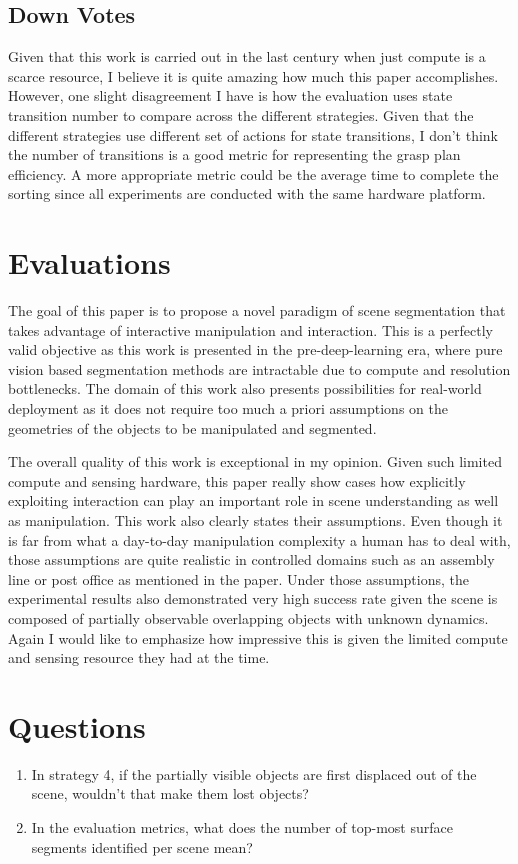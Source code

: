 \documentclass[10pt, twocolumn]{article}
\begin{document}
\subsection{Down Votes}
Given that this work is carried out in the last century when just compute is
a scarce resource, I believe it is quite amazing how much this paper accomplishes.
However, one slight disagreement I have is how the evaluation uses state transition
number to compare across the different strategies. Given that the different
strategies use different set of actions for state transitions, I don't think
the number of transitions is a good metric for representing the grasp plan efficiency.
A more appropriate metric could be the average time to complete the sorting
since all experiments are conducted with the same hardware platform.

\section{Evaluations}
The goal of this paper is to propose a novel paradigm of scene segmentation that
takes advantage of interactive manipulation and interaction. This is a perfectly
valid objective as this work is presented in the pre-deep-learning era, where
pure vision based segmentation methods are intractable due to compute and
resolution bottlenecks. The domain of this work also presents possibilities
for real-world deployment as it does not require too much a priori assumptions
on the geometries of the objects to be manipulated and segmented.

The overall quality of this work is exceptional in my opinion. Given such
limited compute and sensing hardware, this paper really show cases how
explicitly exploiting interaction can play an important role in scene
understanding as well as manipulation. This work also clearly states their
assumptions. Even though it is far from what a day-to-day manipulation
complexity a human has to deal with, those assumptions are quite realistic
in controlled domains such as an assembly line or post office as mentioned
in the paper. Under those assumptions, the experimental results also demonstrated
very high success rate given the scene is composed of partially observable
overlapping objects with unknown dynamics. Again I would like to emphasize
how impressive this is given the limited compute and sensing resource they
had at the time.

\section{Questions}
\begin{enumerate}
  \item In strategy 4, if the partially visible objects are first displaced
    out of the scene, wouldn't that make them lost objects?

  \item In the evaluation metrics, what does the number of
    top-most surface segments identified per scene mean?
\end{enumerate}
\end{document}
